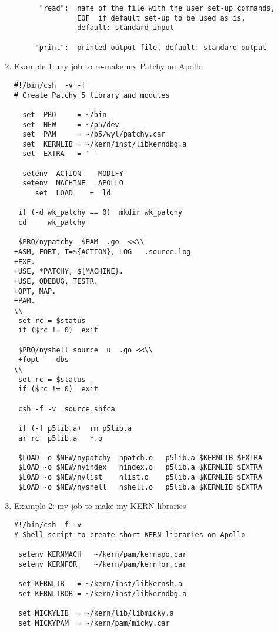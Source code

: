 \begin{enumerate}
\begin{verbatim}
      "read":  name of the file with the user set-up commands,
               EOF  if default set-up to be used as is,
               default: standard input

     "print":  printed output file, default: standard output
\end{verbatim}

\item
Example 1: my job to re-make my Patchy on Apollo
\begin{verbatim}
#!/bin/csh  -v -f
# Create Patchy 5 library and modules

  set  PRO     = ~/bin
  set  NEW     = ~/p5/dev
  set  PAM     = ~/p5/wyl/patchy.car
  set  KERNLIB = ~/kern/inst/libkerndbg.a
  set  EXTRA   = ' '

  setenv  ACTION    MODIFY
  setenv  MACHINE   APOLLO
     set  LOAD    =  ld

 if (-d wk_patchy == 0)  mkdir wk_patchy
 cd     wk_patchy

 $PRO/nypatchy  $PAM  .go  <<\\
+ASM, FORT, T=${ACTION}, LOG   .source.log
+EXE.
+USE, *PATCHY, ${MACHINE}.
+USE, QDEBUG, TESTR.
+OPT, MAP.
+PAM.
\\
 set rc = $status
 if ($rc != 0)  exit

 $PRO/nyshell source  u  .go <<\\
 +fopt   -dbs
\\
 set rc = $status
 if ($rc != 0)  exit

 csh -f -v  source.shfca

 if (-f p5lib.a)  rm p5lib.a
 ar rc  p5lib.a   *.o

 $LOAD -o $NEW/nypatchy  npatch.o   p5lib.a $KERNLIB $EXTRA
 $LOAD -o $NEW/nyindex   nindex.o   p5lib.a $KERNLIB $EXTRA
 $LOAD -o $NEW/nylist    nlist.o    p5lib.a $KERNLIB $EXTRA
 $LOAD -o $NEW/nyshell   nshell.o   p5lib.a $KERNLIB $EXTRA
\end{verbatim}
\item
Example 2: my job to make my KERN libraries
\begin{verbatim}
#!/bin/csh -f -v
# Shell script to create short KERN libraries on Apollo

 setenv KERNMACH   ~/kern/pam/kernapo.car
 setenv KERNFOR    ~/kern/pam/kernfor.car

 set KERNLIB   = ~/kern/inst/libkernsh.a
 set KERNLIBDB = ~/kern/inst/libkerndbg.a

 set MICKYLIB  = ~/kern/lib/libmicky.a
 set MICKYPAM  = ~/kern/pam/micky.car


\end{verbatim}
\end{enumerate}
